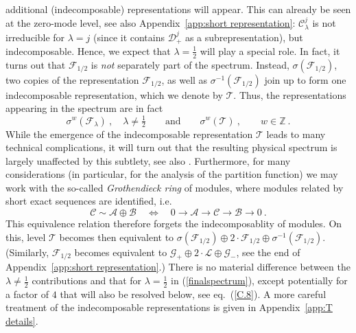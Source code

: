 \documentclass[12pt,a4paper]{article}
\newcommand{\be}{\begin{equation}}
\newcommand{\ee}{\end{equation}}
\begin{document}
 additional (indecomposable) representations will appear. 
 This can already be seen at the zero-mode level, see also Appendix~\ref{app:short representation}: $\mathscr{C}^j_\lambda$ is not irreducible for $\lambda=j$ (since it contains $\mathscr{D}^j_+$ as a subrepresentation), but indecomposable. Hence, we expect that $\lambda=\tfrac{1}{2}$ will play a special role. In fact, it turns out that $\mathscr{F}_{1/2}$ is \textit{not} separately part of the spectrum. Instead, $\sigma(\mathscr{F}_{1/2})$, two copies of the representation $\mathscr{F}_{1/2}$, as well as $\sigma^{-1}(\mathscr{F}_{1/2})$ join up to form one indecomposable representation, which we denote by $\mathscr{T}$. Thus, the representations appearing in the spectrum are in fact
\be \label{finalspectrum}
\sigma^w(\mathscr{F}_\lambda)\ , \quad \lambda \ne \tfrac{1}{2} \qquad\text{and}\qquad \sigma^{w}(\mathscr{T})\ , \qquad w \in \mathds{Z}\ .
\ee
While the emergence of the indecomposable representation $\mathscr{T}$ leads to many technical complications, it will turn out that the resulting physical spectrum is largely unaffected by this subtlety, see also \cite{Troost:2011fd,Gaberdiel:2011vf}. Furthermore, for many considerations (in particular, for the analysis of the partition function) we may work with the so-called 
%
\textit{Grothendieck ring} of modules, where modules related by short exact sequences are identified, i.e.\ 
\be \label{Grothendieck}
\mathscr{C} \sim \mathscr{A} \oplus \mathscr{B} \quad \Longleftrightarrow \quad 0 \longrightarrow \mathscr{A} \longrightarrow \mathscr{C} \longrightarrow \mathscr{B} \longrightarrow 0\ .
\ee
This equivalence relation therefore forgets the indecomposablity of modules. 
On this, level $\mathscr{T}$ becomes then equivalent to $\sigma(\mathscr{F}_{1/2})\oplus 2\cdot \mathscr{F}_{1/2}\oplus \sigma^{-1}(\mathscr{F}_{1/2})$. (Similarly, $\mathscr{F}_{1/2}$ becomes equivalent to $\mathscr{G}_+\oplus2\cdot \mathscr{L}\oplus \mathscr{G}_-$, see the end of Appendix~\ref{app:short representation}.) There is no material difference between the $\lambda \neq  \tfrac{1}{2}$ contributions and that for $\lambda = \tfrac{1}{2}$ in (\ref{finalspectrum}), except potentially for a factor of $4$ that will also be resolved below, see eq.~(\ref{C.8}). A more careful treatment of the indecomposable representations is given in Appendix~\ref{app:T details}.
\end{document}
